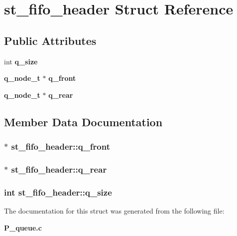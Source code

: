 \section{st\_\-fifo\_\-header  Struct Reference}
\label{structst__fifo__header}
\subsection*{Public Attributes}
\begin{CompactItemize}
\item 
int {\bf q\_\-size}
\item 
{\bf q\_\-node\_\-t} $\ast$ {\bf q\_\-front}
\item 
{\bf q\_\-node\_\-t} $\ast$ {\bf q\_\-rear}
\end{CompactItemize}


\subsection{Member Data Documentation}
\subsubsection{$\ast$ st\_\-fifo\_\-header::q\_\-front}\label{structst__fifo__header_m1}


\subsubsection{$\ast$ st\_\-fifo\_\-header::q\_\-rear}\label{structst__fifo__header_m2}


\subsubsection{\setlength{\rightskip}{0pt plus 5cm}int st\_\-fifo\_\-header::q\_\-size}\label{structst__fifo__header_m0}




The documentation for this struct was generated from the following file:\begin{CompactItemize}
\item 
{\bf P\_\-queue.c}\end{CompactItemize}
